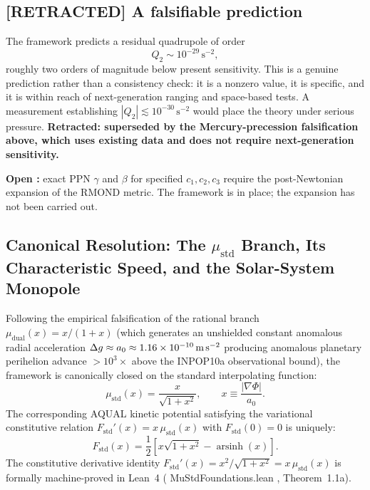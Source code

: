 \documentclass[aps,prd,preprint,superscriptaddress,nofootinbib,amsmath,amssymb,floatfix]{revtex4-2}
\makeatletter
\DeclareRobustCommand{\rntexttt}[1]{%
  \ifmmode
    \nfss@text{\ttfamily\hyphenchar\font=-1 #1}%
  \else
    \hmode@bgroup\ttfamily\hyphenchar\font=-1 #1\egroup
  \fi}
\DeclareRobustCommand{\_}{%
    \ifmmode\nfss@text{\textunderscore}\else\textunderscore\penalty\z@\fi}%
\let\texttt\rntexttt
\makeatother
\begin{document}
\subsection*{[RETRACTED] A falsifiable prediction}

The framework predicts a residual quadrupole of order
\begin{equation}
\label{eq:q2pred_orig}
Q_2 \sim 10^{-29}\,\text{s}^{-2},
\end{equation}
roughly two orders of magnitude below present sensitivity. This is a genuine prediction rather than a consistency check: it is a nonzero value, it is specific, and it is within reach of next-generation ranging and space-based tests. A measurement establishing $|Q_2| \lesssim 10^{-30}\,\text{s}^{-2}$ would place the theory under serious pressure. \textbf{Retracted: superseded by the Mercury-precession falsification above, which uses existing data and does not require next-generation sensitivity.}

\textbf{Open :} exact PPN $\gamma$ and $\beta$ for specified $c_1,c_2,c_3$ require the post-Newtonian expansion of the RMOND metric. The framework is in place; the expansion has not been carried out.

\subsection{Canonical Resolution: The $\mu_{\text{std}}$ Branch, Its Characteristic Speed, and the Solar-System Monopole}
\label{sec:mu_std_clearance}

Following the empirical falsification of the rational branch $\mu_{\text{dual}}(x) = x/(1+x)$ (which generates an unshielded constant anomalous radial acceleration $\Delta g \approx a_0 \approx 1.16 \times 10^{-10}\,\text{m\,s}^{-2}$ producing anomalous planetary perihelion advance $> 10^3\times$ above the INPOP10a observational bound), the framework is canonically closed on the standard interpolating function:
\begin{equation}
\label{eq:mu_std_canonical}
\mu_{\text{std}}(x) = \frac{x}{\sqrt{1 + x^2}}, \qquad x \equiv \frac{|\nabla\Phi|}{a_0}.
\end{equation}
The corresponding AQUAL kinetic potential satisfying the variational constitutive relation $F_{\text{std}}'(x) = x\,\mu_{\text{std}}(x)$ with $F_{\text{std}}(0) = 0$ is uniquely:
\begin{equation}
\label{eq:F_std_canonical}
F_{\text{std}}(x) = \frac{1}{2} \left[ x\sqrt{1 + x^2} - \operatorname{arsinh}(x) \right].
\end{equation}
The constitutive derivative identity $F_{\text{std}}'(x) = x^2/\sqrt{1+x^2} = x\,\mu_{\text{std}}(x)$ is formally machine-proved  in Lean~4 (\texttt{MuStdFoundations.lean}, Theorem~1.1a).
\end{document}
